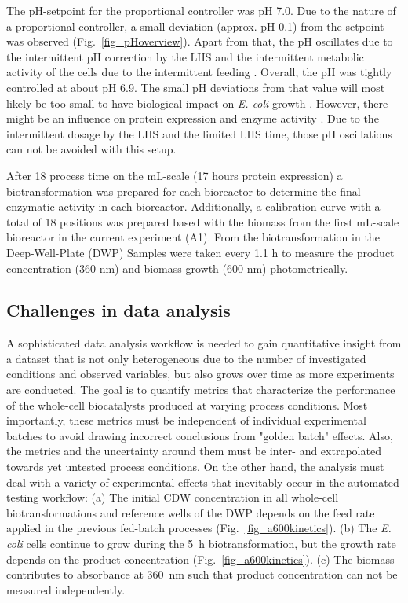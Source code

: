 \documentclass[sn-standardnature]{sn-jnl}%
\theoremstyle{thmstyleone}%
\theoremstyle{thmstyletwo}%
\theoremstyle{thmstylethree}%
\begin{document}
The pH-setpoint for the proportional controller was pH 7.0.
Due to the nature of a proportional controller, a small deviation (approx. pH 0.1) from the setpoint was observed (Fig.~\ref{fig_pHoverview}).
Apart from that, the pH oscillates due to the intermittent pH correction by the LHS and the intermittent metabolic activity of the cells due to the intermittent feeding \cite{kim2004high}.
Overall, the pH was tightly controlled at about pH 6.9.
The small pH deviations from that value will most likely be too small to have biological impact on \textit{E. coli} growth \cite{presser1997modelling,gale1942effect}.
However, there might be an influence on protein expression and enzyme activity \cite{cui2009influence,strandberg1991factors}.
Due to the intermittent dosage by the LHS and the limited LHS time, those pH oscillations can not be avoided with this setup.

After 18 process time on the mL-scale (17 hours protein expression) a biotransformation was prepared for each bioreactor to determine the final enzymatic activity in each bioreactor.
Additionally, a calibration curve with a total of 18 positions was prepared based with the biomass from the first mL-scale bioreactor in the current experiment (A1).
From the biotransformation in the Deep-Well-Plate (DWP) Samples were taken every 1.1 h to measure the product concentration (360 nm) and biomass growth (600 nm) photometrically.

\subsection{Challenges in data analysis}
A sophisticated data analysis workflow is needed to gain quantitative insight from a dataset that is not only heterogeneous due to the number of investigated conditions and observed variables, but also grows over time as more experiments are conducted.
The goal is to quantify metrics that characterize the performance of the whole-cell biocatalysts produced at varying process conditions.
Most importantly, these metrics must be independent of individual experimental batches to avoid drawing incorrect conclusions from "golden batch" effects.
Also, the metrics and the uncertainty around them must be inter- and extrapolated towards yet untested process conditions.
On the other hand, the analysis must deal with a variety of experimental effects that inevitably occur in the automated testing workflow:
(a) The initial CDW concentration in all whole-cell biotransformations and reference wells of the DWP depends on the feed rate applied in the previous fed-batch processes (Fig.~\ref{fig_a600kinetics}).
(b) The \textit{E. coli} cells continue to grow during the 5~h biotransformation, but the growth rate depends on the product concentration (Fig.~\ref{fig_a600kinetics}).
(c) The biomass contributes to absorbance at 360~nm such that product concentration can not be measured independently.
\end{document}
